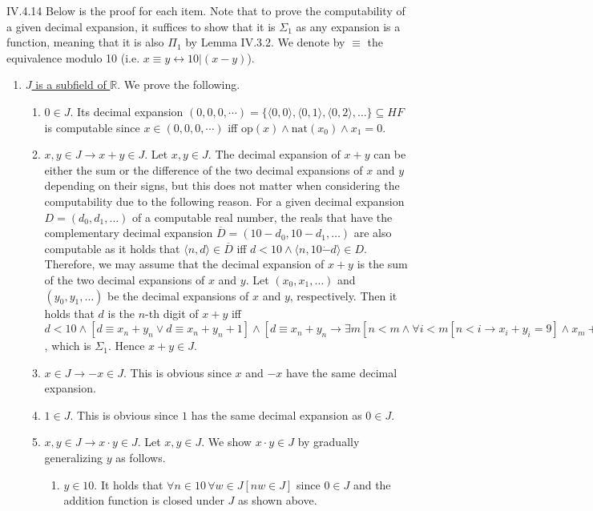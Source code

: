 \documentclass[12pt]{article}
\begin{document}
\begin{customthm}{IV.4.14}
  Below is the proof for each item. Note that to prove the computability of a given decimal expansion, it suffices to show that it is $\Sigma_1$ as any expansion is a function, meaning that it is also $\Pi_1$ by Lemma IV.3.2. We denote by $\equiv$ the equivalence modulo 10 (i.e. $x\equiv y\leftrightarrow10|(x-y)$).
  \begin{enumerate}
    \item\underline{$J$ is a subfield of $\mathbb{R}$}. We prove the following.
    \begin{enumerate}
      \item\underline{$0\in J$}. Its decimal expansion $(0,0,0,\cdots)=\{\langle0,0\rangle,\langle0,1\rangle,\langle0,2\rangle,\ldots\}\subseteq HF$ is computable since $x\in(0,0,0,\cdots)$ iff $\mathrm{op}(x)\wedge\mathrm{nat}(x_0)\wedge x_1=0$.
      \item\underline{$x,y\in J\rightarrow x+y\in J$}. Let $x,y\in J$. The decimal expansion of $x+y$ can be either the sum or the difference of the two decimal expansions of $x$ and $y$ depending on their signs, but this does not matter when considering the computability due to the following reason. For a given decimal expansion $D=(d_0,d_1,\ldots)$ of a computable real number, the reals that have the complementary decimal expansion $\overline{D}=(10-d_0,10-d_1,\ldots)$ are also computable as it holds that $\langle n,d\rangle\in\overline{D}$ iff $d<10\wedge\langle n,10\dot{-}d\rangle\in D$. Therefore, we may assume that the decimal expansion of $x+y$ is the sum of the two decimal expansions of $x$ and $y$. Let $(x_0,x_1,\ldots)$ and $(y_0,y_1,\ldots)$ be the decimal expansions of $x$ and $y$, respectively. Then it holds that $d$ is the $n$-th digit of $x+y$ iff $d<10\wedge[d\equiv x_n+y_n\vee d\equiv x_n+y_n+1]\wedge[d\equiv x_n+y_n\rightarrow\exists m[n<m\wedge\forall i<m[n<i\rightarrow x_i+y_i=9]\wedge x_m+y_m<9]]$, which is $\Sigma_1$. Hence $x+y\in J$.
      \item\underline{$x\in J\rightarrow-x\in J$}. This is obvious since $x$ and $-x$ have the same decimal expansion.
      \item\underline{$1\in J$}. This is obvious since $1$ has the same decimal expansion as $0\in J$.
      \item\underline{$x,y\in J\rightarrow x\cdot y\in J$}. Let $x,y\in J$. We show $x\cdot y\in J$ by gradually generalizing $y$ as follows.
      \begin{enumerate}
        \item\underline{$y\in10$}. It holds that $\forall n\in10\,\forall w\in J[nw\in J]$ since $0\in J$ and the addition function is closed under $J$ as shown above.

\end{enumerate}
\end{enumerate}
\end{enumerate}
\end{customthm}
\end{document}
